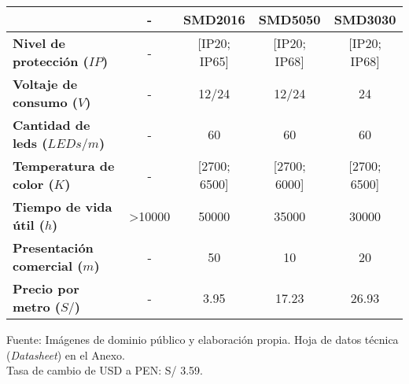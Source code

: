 \begin{savenotes}
\begin{mytable}[H]
\begin{tabular}{l|c|c|c|c|}
{\begin{minipage}{\myforthmaxsizeofcontenttable}
				\end{minipage}
			} & - & SMD2016 & SMD5050 & SMD3030 \\ \hline
			\multicolumn{1}{|l|}{
				\begin{minipage}{\myforthmaxsizeofcontenttable}	
					\textbf{Nivel de protección ($IP$)}
				\end{minipage}
			} & - & [IP20; IP65] & [IP20; IP68] & [IP20; IP68] \\ \hline
			\multicolumn{1}{|l|}{
				\begin{minipage}{\myforthmaxsizeofcontenttable}	
					\textbf{Voltaje de consumo ($V$)}
				\end{minipage}
			} & - & 12/24 & 12/24 & 24 \\ \hline
			\multicolumn{1}{|l|}{
				\begin{minipage}{\myforthmaxsizeofcontenttable}	
					\textbf{Cantidad de leds ($LEDs/m$)}
				\end{minipage}
			} & - & 60 & 60 & 60 \\ \hline
			\multicolumn{1}{|l|}{
				\begin{minipage}{\myforthmaxsizeofcontenttable}	
					\textbf{Temperatura de color ($K$)}
				\end{minipage}
			} & - & [2700; 6500] & [2700; 6000] & [2700; 6500] \\ \hline
			\multicolumn{1}{|l|}{
				\begin{minipage}{\myforthmaxsizeofcontenttable}	
					\textbf{Tiempo de vida útil ($h$)}
				\end{minipage}
			} & >10000 & 50000 & 35000 & 30000 \\ \hline
			\multicolumn{1}{|l|}{
				\begin{minipage}{\myforthmaxsizeofcontenttable}	
					\textbf{Presentación comercial ($m$)}
				\end{minipage}
			} & - & 50 & 10 & 20 \\ \hline
			\multicolumn{1}{|l|}{
				\begin{minipage}{\myforthmaxsizeofcontenttable}	
					\textbf{Precio por metro ($S/$)}
				\end{minipage}
			} & - & 3.95 & 17.23 & 26.93 \\ \hline
		\end{tabular}
		\begin{myflushcenteraftertable}	
			Fuente: Imágenes de dominio público y elaboración propia. Hoja de datos técnica (\textit{Datasheet}) en el Anexo.\\
			Tasa de cambio de USD a PEN: S/ 3.59.
		\end{myflushcenteraftertable}
	\end{mytable}
\end{savenotes}

